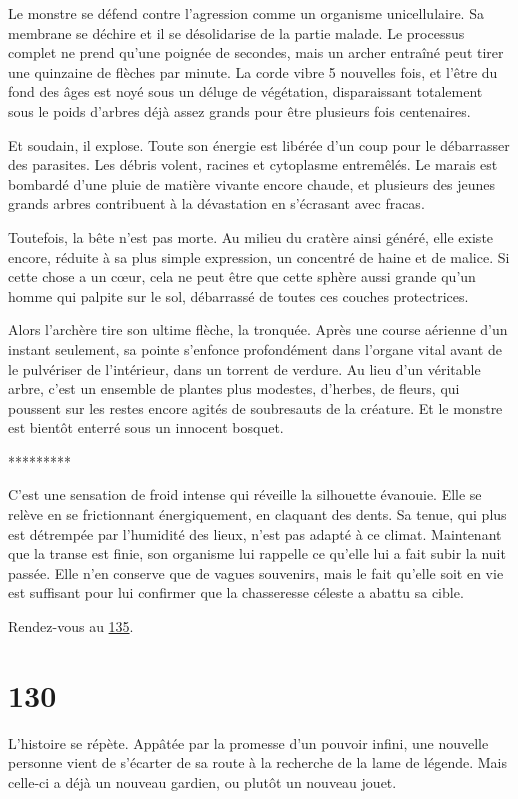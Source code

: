 \documentclass{report}
\newcommand{\gsection}[1]{
    \section{#1}
    \label{section-#1}
}
\newcommand{\glink}[1]{\hyperref[section-#1]{#1}}
\newcommand{\ellipse}{
    \begin{center}
        *********
    \end{center}
}
\begin{document}
Le monstre se défend contre l'agression comme un organisme unicellulaire. Sa membrane se déchire et il se désolidarise de la partie malade. Le processus complet ne prend qu'une poignée de secondes, mais un archer entraîné peut tirer une quinzaine de flèches par minute. La corde vibre 5 nouvelles fois, et l'être du fond des âges est noyé sous un déluge de végétation, disparaissant totalement sous le poids d'arbres déjà assez grands pour être plusieurs fois centenaires. 

Et soudain, il explose. Toute son énergie est libérée d'un coup pour le débarrasser des parasites. Les débris volent, racines et cytoplasme entremêlés. Le marais est bombardé d'une pluie de matière vivante encore chaude, et plusieurs des jeunes grands arbres contribuent à la dévastation en s'écrasant avec fracas.

Toutefois, la bête n'est pas morte. Au milieu du cratère ainsi généré, elle existe encore, réduite à sa plus simple expression, un concentré de haine et de malice. Si cette chose a un cœur, cela ne peut être que cette sphère aussi grande qu'un homme qui palpite sur le sol, débarrassé de toutes ces couches protectrices.

Alors l'archère tire son ultime flèche, la tronquée. Après une course aérienne d'un instant seulement, sa pointe s'enfonce profondément dans l'organe vital  avant de le pulvériser de l'intérieur, dans un torrent de verdure. Au lieu d'un véritable arbre, c'est un ensemble de plantes plus modestes, d'herbes, de fleurs, qui poussent sur les restes encore agités de soubresauts de la créature. Et le monstre est bientôt enterré sous un innocent bosquet.

\ellipse

C'est une sensation de froid intense qui réveille la silhouette évanouie. Elle se relève en se frictionnant énergiquement, en claquant des dents. Sa tenue, qui plus est détrempée par l'humidité des lieux, n'est pas adapté à ce climat. Maintenant que la transe est finie, son organisme lui rappelle ce qu'elle lui a fait subir la nuit passée. Elle n'en conserve que de vagues souvenirs, mais le fait qu'elle soit en vie est suffisant pour lui confirmer que la chasseresse céleste a abattu sa cible.

Rendez-vous au \glink{135}.

\gsection{130}

L'histoire se répète. Appâtée par la promesse d'un pouvoir infini, une nouvelle personne vient de s'écarter de sa route à la recherche de la lame de légende. Mais celle-ci a déjà un nouveau gardien, ou plutôt un nouveau jouet.
\end{document}
